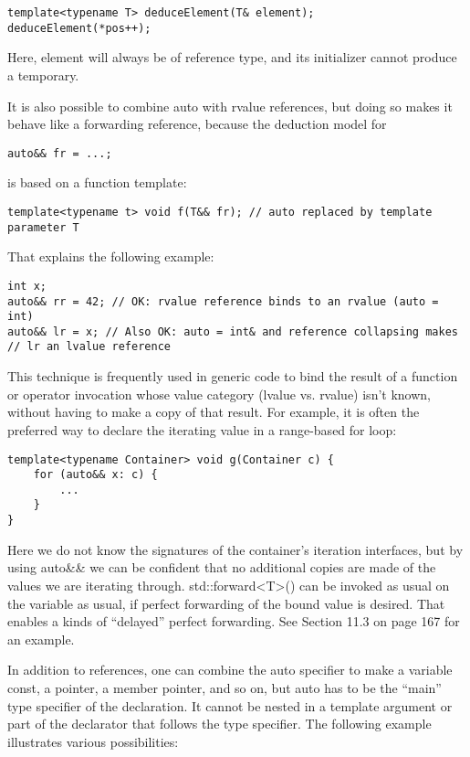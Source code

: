 \begin{lstlisting}[style=styleCXX]
template<typename T> deduceElement(T& element);
deduceElement(*pos++);
\end{lstlisting}

Here, element will always be of reference type, and its initializer cannot produce a temporary.

It is also possible to combine auto with rvalue references, but doing so makes it behave like a forwarding reference, because the deduction model for

\begin{lstlisting}[style=styleCXX]
auto&& fr = ...;
\end{lstlisting}

is based on a function template:

\begin{lstlisting}[style=styleCXX]
template<typename t> void f(T&& fr); // auto replaced by template parameter T
\end{lstlisting}

That explains the following example:

\begin{lstlisting}[style=styleCXX]
int x;
auto&& rr = 42; // OK: rvalue reference binds to an rvalue (auto = int)
auto&& lr = x; // Also OK: auto = int& and reference collapsing makes
// lr an lvalue reference
\end{lstlisting}

This technique is frequently used in generic code to bind the result of a function or operator invocation whose value category (lvalue vs. rvalue) isn’t known, without having to make a copy of that result. For example, it is often the preferred way to declare the iterating value in a range-based for loop:

\begin{lstlisting}[style=styleCXX]
template<typename Container> void g(Container c) {
	for (auto&& x: c) {
		...
	}
}
\end{lstlisting}

Here we do not know the signatures of the container’s iteration interfaces, but by using auto\&\& we can be confident that no additional copies are made of the values we are iterating through. std::forward<T>() can be invoked as usual on the variable as usual, if perfect forwarding of the bound value is desired. That enables a kinds of “delayed” perfect forwarding. See Section 11.3 on page 167 for an example.

In addition to references, one can combine the auto specifier to make a variable const, a pointer, a member pointer, and so on, but auto has to be the “main” type specifier of the declaration. It cannot be nested in a template argument or part of the declarator that follows the type specifier. The following example illustrates various possibilities:

